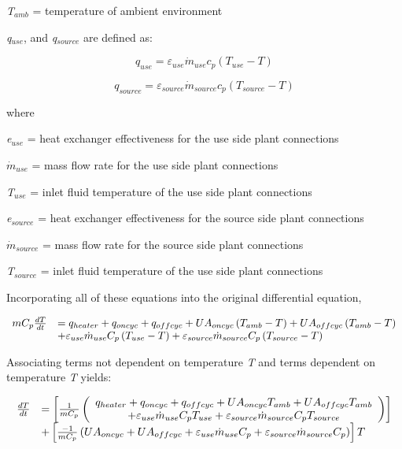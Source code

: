 \emph{T\(_{amb}\)} = temperature of ambient environment

\emph{q\(_{use}\)}, and \emph{q\(_{source}\)} are defined as:

\begin{equation}
{q_{use}} = {\varepsilon_{use}}{\dot m_{use}}{c_p}\left( {{T_{use}} - T} \right)
\end{equation}

\begin{equation}
{q_{source}} = {\varepsilon_{source}}{\dot m_{source}}{c_p}\left( {{T_{source}} - T} \right)
\end{equation}

where

\emph{e\(_{use}\)} = heat exchanger effectiveness for the use side plant connections

\({\dot m_{use}}\) = mass flow rate for the use side plant connections

\emph{T\(_{use}\)} = inlet fluid temperature of the use side plant connections

\emph{e\(_{source}\)} = heat exchanger effectiveness for the source side plant connections

\({\dot m_{source}}\) = mass flow rate for the source side plant connections

\emph{T\(_{source}\)} = inlet fluid temperature of the use side plant connections

Incorporating all of these equations into the original differential equation,

\begin{equation}
  \begin{array}{ll}
    mC_p\frac{dT}{dt} &= q_{heater} + q_{oncyc} + q_{offcyc} + UA_{oncyc} \left(T_{amb} - T\right) + UA_{offcyc} \left(T_{amb} - T\right) \\ 
                      &+ \varepsilon_{use}\dot{m}_{use}C_p \left(T_{use} - T\right) + \varepsilon_{source}\dot{m}_{source}C_p \left(T_{source} - T\right)
  \end{array}
\end{equation}

Associating terms not dependent on temperature \emph{T} and terms dependent on temperature \emph{T} yields:

\begin{equation}
  \begin{array}{ll}
    \frac{dT}{dt} &= \left[\frac{1}{mC_p}\left(\begin{array}{c}
                                             q_{heater}+q_{oncyc}+q_{offcyc}+UA_{oncyc}T_{amb}+UA_{offcyc}T_{amb} \\
                                             + \varepsilon_{use}\dot{m}_{use}C_pT_{use} + \varepsilon_{source}\dot{m}_{source}C_pT_{source}
                                           \end{array}\right)\right] \\
                  &+ \left[\frac{-1}{mC_p}\left(UA_{oncyc} + UA_{offcyc}+\varepsilon_{use}\dot{m}_{use}C_p+\varepsilon_{source}\dot{m}_{source}C_p\right)\right]T
  \end{array}
\end{equation}

